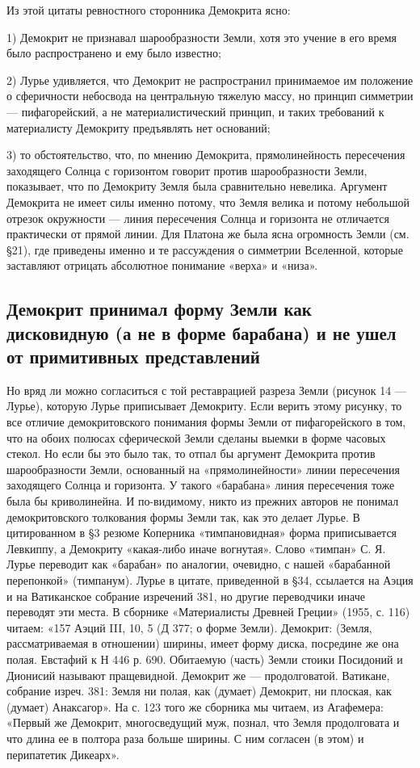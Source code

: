 Из этой цитаты ревностного сторонника Демокрита ясно:

1) Демокрит не признавал шарообразности Земли, хотя это учение в его
время было распространено и ему было известно;

2) Лурье удивляется, что Демокрит не распространил принимаемое им
положение о сферичности небосвода на центральную тяжелую массу, но
принцип симметрии --- пифагорейский, а не материалистический принцип,
и таких требований к материалисту Демокриту предъявлять нет оснований;

3) то обстоятельство, что, по мнению Демокрита, прямолинейность
пересечения заходящего Солнца с горизонтом говорит против
шарообразности Земли, показывает, что по Демокриту Земля была
сравнительно невелика. Аргумент Демокрита не имеет силы именно потому,
что Земля велика и потому небольшой отрезок окружности --- линия
пересечения Солнца и горизонта не отличается практически от прямой
линии. Для Платона же была ясна огромность Земли (см. §21), где
приведены именно и те рассуждения о симметрии Вселенной, которые
заставляют отрицать абсолютное понимание «верха» и «низа».

\subsection{Демокрит принимал форму Земли как дисковидную (а не в
форме барабана) и не ушел от примитивных представлений}

Но вряд ли можно согласиться с той реставрацией разреза Земли
(рисунок 14 --- Лурье), которую Лурье приписывает Демокриту. Если
верить этому рисунку, то все отличие демокритовского понимания формы
Земли от пифагорейского в том, что на обоих полюсах сферической Земли
сделаны выемки в форме часовых стекол. Но если бы это было так, то
отпал бы аргумент Демокрита против шарообразности Земли, основанный на
«прямолинейности» линии пересечения заходящего Солнца и горизонта. У
такого «барабана» линия пересечения тоже была бы криволинейна. И
по-видимому, никто из прежних авторов не понимал демокритовского
толкования формы Земли так, как это делает Лурье. В цитированном в §3
резюме Коперника «тимпановидная» форма приписывается Левкиппу, а
Демокриту «какая-либо иначе вогнутая». Слово «тимпан» С. Я. Лурье
переводит как «барабан» по аналогии, очевидно, с нашей «барабанной
перепонкой» (тимпанум). Лурье в цитате, приведенной в §34, ссылается
на Аэция и на Ватиканское собрание изречений 381, но другие
переводчики иначе переводят эти места. В сборнике «Материалисты
Древней Греции» (1955, с. 116) читаем: «157 Аэций III, 10, 5 (Д 377; о
форме Земли). Демокрит: (Земля, рассматриваемая в отношении) ширины,
имеет форму диска, посредине же она полая. Евстафий к Н 446 р. 690.
Обитаемую (часть) Земли стоики Посидоний и Дионисий называют
пращевидной. Демокрит же --- продолговатой. Ватикане, собрание изреч.
381: Земля ни полая, как (думает) Демокрит, ни плоская, как (думает)
Анаксагор». На с. 123 того же сборника мы читаем, из Агафемера:
«Первый же Демокрит, многосведущий муж, познал, что Земля продолговата
и что длина ее в полтора раза больше ширины. С ним согласен (в этом) и
перипатетик Дикеарх».

